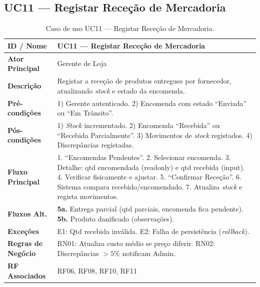 \documentclass[a4paper,12pt]{scrreprt}
\begin{document}
\subsection*{UC11 --- Registar Receção de Mercadoria}
\begin{table}[H]
\centering\small
\begin{tabular}{|p{3cm}|p{11cm}|}
\hline
\textbf{ID / Nome} & UC11 --- Registar Receção de Mercadoria \\
\hline
\textbf{Ator Principal} & Gerente de Loja \\
\hline
\textbf{Descrição} & Registar a receção de produtos entregues por fornecedor, atualizando \textit{stock} e estado da encomenda. \\
\hline
\textbf{Pré-condições} & 1) Gerente autenticado. 2) Encomenda com estado ``Enviada'' ou ``Em Trânsito''. \\
\hline
\textbf{Pós-condições} & 1) \textit{Stock} incrementado. 2) Encomenda ``Recebida'' ou ``Recebida Parcialmente''. 3) Movimentos de \textit{stock} registados. 4) Discrepâncias registadas. \\
\hline
\textbf{Fluxo Principal} & 1. ``Encomendas Pendentes''. 2. Selecionar encomenda. 3. Detalhe: qtd encomendada (readonly) e qtd recebida (input). 4. Verificar fisicamente e ajustar. 5. ``Confirmar Receção''. 6. Sistema compara recebido/encomendado. 7. Atualiza \textit{stock} e regista movimentos. \\
\hline
\textbf{Fluxos Alt.} & \textbf{5a.} Entrega parcial (qtd parciais, encomenda fica pendente). \textbf{5b.} Produto danificado (observações). \\
\hline
\textbf{Exceções} & E1: Qtd recebida inválida. E2: Falha de persistência (\textit{rollback}). \\
\hline
\textbf{Regras de Negócio} & RN01: Atualiza custo médio se preço diferir. RN02: Discrepâncias $> 5$\% notificam Admin. \\
\hline
\textbf{RF Associados} & RF06, RF08, RF10, RF11 \\
\hline
\end{tabular}
\caption{Caso de uso UC11 --- Registar Receção de Mercadoria.}
\end{table}

\end{document}

